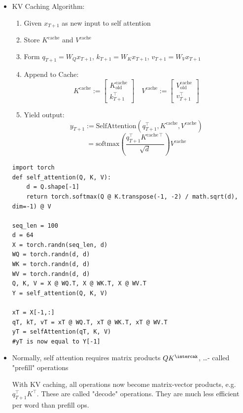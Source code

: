 \documentclass{article}
\begin{document}
\begin{itemize}
\item KV Caching Algorithm:
\begin{enumerate}
\item Given $x_{T+1}$ as new input to self attention
\item Store $K^\mathrm{cache}$ and  $V^\mathrm{cache}$
\item Form $q_{T+1}=W_Q x_{T+1}$, $k_{T+1}=W_K x_{T+1}$, $v_{T+1}=W_V x_{T+1}$ 
\item Append to Cache:
$$K^\mathrm{cache}:=
\begin{bmatrix}K^\mathrm{cache}_\mathrm{old}\\k_{T+1}^\intercal\end{bmatrix}
\quad V^\mathrm{cache}:=
\begin{bmatrix}V^\mathrm{cache}_\mathrm{old}\\v_{T+1}^\intercal\end{bmatrix}
$$
\item Yield output:
$$y_{T+1} := \mathrm{SelfAttention}(q_{T+1}^\intercal, K^\mathrm{cache}, V^\mathrm{cache})$$
$$= \mathrm{softmax}\left(\frac{q_{T+1}^\intercal K^{\mathrm{cache}\intercal}}{\sqrt{d}}\right)V^\mathrm{cache}$$
\end{enumerate}

\begin{verbatim}
import torch
def self_attention(Q, K, V):
    d = Q.shape[-1]
    return torch.softmax(Q @ K.transpose(-1, -2) / math.sqrt(d), dim=-1) @ V

seq_len = 100
d = 64
X = torch.randn(seq_len, d)
WQ = torch.randn(d, d)
WK = torch.randn(d, d)
WV = torch.randn(d, d)
Q, K, V = X @ WQ.T, X @ WK.T, X @ WV.T
Y = self_attention(Q, K, V)

xT = X[-1,:]
qT, kT, vT = xT @ WQ.T, xT @ WK.T, xT @ WV.T
yT = selfAttention(qT, K, V)
#yT is now equal to Y[-1]
\end{verbatim}

\item Normally, self attention requires matrix products $QK^\intercak$, \dots - called "prefill" operations

\items With KV caching, all operations now become matrix-vector products, e.g. $q_{T+1}^\intercal K^\intercal$. These are called "decode" operations. They are much less efficient per word than prefill ops.
\end{itemize}
\end{document}
